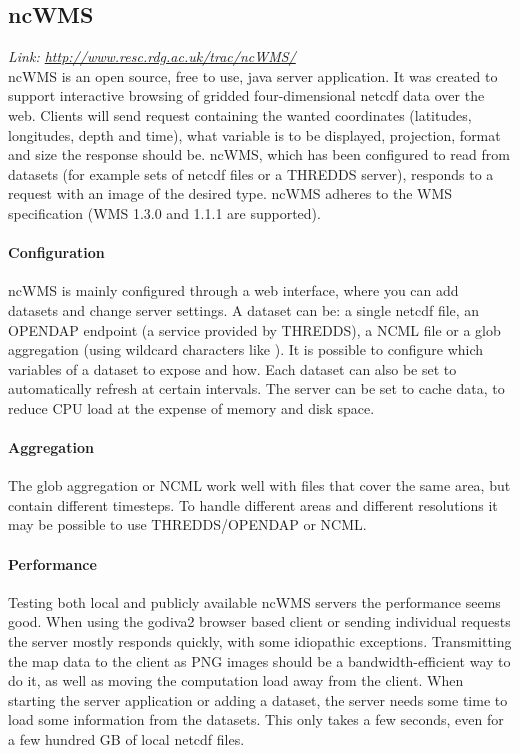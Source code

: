 \documentclass[11pt,a4paper,titlepage,oneside]{report}
\begin{document}
    \subsection{ncWMS}
  \emph{Link: \url{http://www.resc.rdg.ac.uk/trac/ncWMS/}} \\%
    ncWMS is an \gls{open source}, free to use, java server application. It was created to support interactive browsing of gridded four-dimensional \gls{netcdf} data over the web. Clients will send request containing the wanted coordinates (latitudes, longitudes, depth and time), what variable is to be displayed, projection, format and size the response should be. ncWMS, which has been configured to read from datasets (for example sets of \gls{netcdf} files or a \gls{THREDDS} server), responds to a request with an image of the desired type. ncWMS adheres to the \gls{WMS} specification (\gls{WMS} 1.3.0 and 1.1.1 are supported).
    \paragraph{Configuration}
    ncWMS is mainly configured through a web interface, where you can add datasets and change server settings. A dataset can be: a single \gls{netcdf} file, an \gls{OPENDAP} endpoint (a service provided by \gls{THREDDS}), a \gls{NCML} file or a glob aggregation (using wildcard characters like ). It is possible to configure which variables of a dataset to expose and how. Each dataset can also be set to automatically refresh at certain intervals. The server can be set to cache data, to reduce \gls{CPU} load at the expense of memory and disk space.
    \paragraph{Aggregation}
    The glob aggregation or \gls{NCML} work well with files that cover the same area, but contain different timesteps. To handle different areas and different resolutions it may be possible to use \gls{THREDDS}/\gls{OPENDAP} or \gls{NCML}.
    \paragraph{Performance}
    Testing both local and publicly available ncWMS servers the performance seems good. When using the godiva2 browser based client or sending individual requests the server mostly responds quickly, with some idiopathic exceptions. Transmitting the map data to the client as \gls{PNG} images should be a bandwidth-efficient way to do it, as well as moving the computation load away from the client. When starting the server application or adding a dataset, the server needs some time to load some information from the datasets. This only takes a few seconds, even for a few hundred GB of local \gls{netcdf} files.
\end{document}

